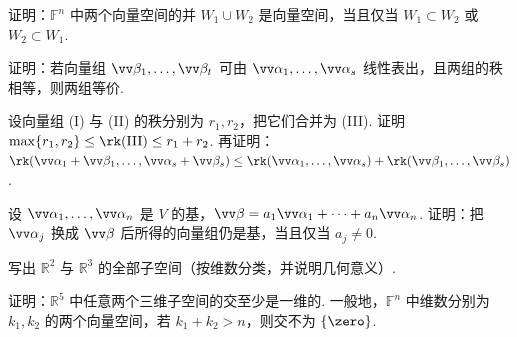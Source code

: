 {		\Bgroup
		\begin{exB}
			\item\label{ex:vs:B1} 证明：$\mathbb{F}^n$ 中两个向量空间的并 $W_1\cup W_2$ 是向量空间，当且仅当 $W_1\subset W_2$ 或 $W_2\subset W_1$.
			\item\label{ex:vs:B2} 证明：若向量组 $\vv\beta_1,\ldots,\vv\beta_t$ 可由 $\vv\alpha_1,\ldots,\vv\alpha_s$ 线性表出，且两组的秩相等，则两组等价.
			\item\label{ex:vs:B3} 设向量组 (I) 与 (II) 的秩分别为 $r_1,r_2$，把它们合并为 (III). 证明 $\max\{r_1,r_2\}\le\rk(\mathrm{III})\le r_1+r_2$. 再证明：$\rk(\vv\alpha_1+\vv\beta_1,\ldots,\vv\alpha_s+\vv\beta_s)\le\rk(\vv\alpha_1,\ldots,\vv\alpha_s)+\rk(\vv\beta_1,\ldots,\vv\beta_s)$.
			\item\label{ex:vs:B4} 设 $\vv\alpha_1,\ldots,\vv\alpha_n$ 是 $V$ 的基，$\vv\beta=a_1\vv\alpha_1+\cdots+a_n\vv\alpha_n$. 证明：把 $\vv\alpha_j$ 换成 $\vv\beta$ 后所得的向量组仍是基，当且仅当 $a_j\ne0$.
			\item\label{ex:vs:B5} 写出 $\mathbb{R}^2$ 与 $\mathbb{R}^3$ 的全部子空间（按维数分类，并说明几何意义）.
			\item\label{ex:vs:B6} 证明：$\mathbb{R}^5$ 中任意两个三维子空间的交至少是一维的. 一般地，$\mathbb{F}^n$ 中维数分别为 $k_1,k_2$ 的两个向量空间，若 $k_1+k_2>n$，则交不为 $\{\zero\}$.
		\end{exB}
		
}
